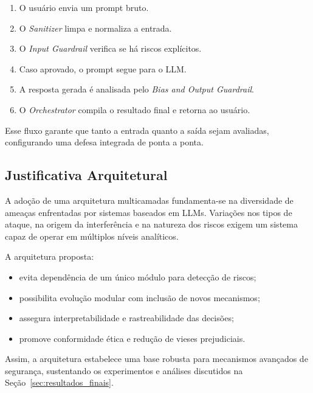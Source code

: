 \begin{enumerate}
    \item O usuário envia um prompt bruto.
    \item O \textit{Sanitizer} limpa e normaliza a entrada.
    \item O \textit{Input Guardrail} verifica se há riscos explícitos.
    \item Caso aprovado, o prompt segue para o LLM.
    \item A resposta gerada é analisada pelo \textit{Bias and Output Guardrail}.
    \item O \textit{Orchestrator} compila o resultado final e retorna ao usuário.
\end{enumerate}

Esse fluxo garante que tanto a entrada quanto a saída sejam avaliadas, configurando uma defesa integrada de ponta a ponta.

\subsection{Justificativa Arquitetural}

A adoção de uma arquitetura multicamadas fundamenta-se na diversidade de ameaças enfrentadas por sistemas baseados em LLMs. Variações nos tipos de ataque, na origem da interferência e na natureza dos riscos exigem um sistema capaz de operar em múltiplos níveis analíticos.

A arquitetura proposta:

\begin{itemize}
    \item evita dependência de um único módulo para detecção de riscos;
    \item possibilita evolução modular com inclusão de novos mecanismos;
    \item assegura interpretabilidade e rastreabilidade das decisões;
    \item promove conformidade ética e redução de vieses prejudiciais.
\end{itemize}

Assim, a arquitetura estabelece uma base robusta para mecanismos avançados de segurança, sustentando os experimentos e análises discutidos na Seção~\ref{sec:resultados_finais}.


